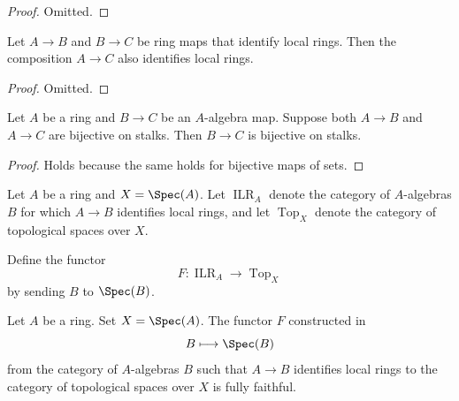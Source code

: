 \begin{proof}
  \leanok
  Omitted.
\end{proof}

\begin{lemma}
  \label{thm:identifies-local-rings-composition}
  Let \(A \to B\) and \(B \to C\) be ring maps that identify local rings. Then the composition \(A \to C\) also identifies local rings.
  \leanok
\end{lemma}

\begin{proof}
  \leanok
  Omitted.
\end{proof}

\begin{lemma}[\stacksproject{096D}]
    Let $A$ be a ring and $B \to C$ be an $A$-algebra map. Suppose both
    $A \to B$ and $A \to C$ are bijective on stalks. Then $B \to C$ is bijective on stalks.
    \label{lemma:bijective-on-stalks-of-comp}
    \leanok
\end{lemma}

\begin{proof}
    \leanok
    Holds because the same holds for bijective maps of sets.
\end{proof}

\begin{definition}
  \label{def:identifies-local-ring-to-top}
  Let $A$ be a ring and $X = \Spec(A)$. Let $\operatorname{ILR}_A$ denote the category of $A$-algebras $B$ for which $A \to B$ identifies local rings, and let $\operatorname{Top}_X$ denote the category of topological spaces over $X$.
  
  Define the functor
  \[
  F \colon \operatorname{ILR}_A \longrightarrow \operatorname{Top}_X
  \]
  by sending $B$ to $\Spec(B)$.
\end{definition}

\begin{lemma}{\cite[\href{https://stacks.math.columbia.edu/tag/096L}{Tag 096L}]{stacks-project}}
  \label{thm:identifies-local-ring-to-top-fully-faithful}
  Let $A$ be a ring. Set $X = \Spec (A)$. The functor \(F\) constructed in 
  \[
  B \longmapsto \Spec (B)
  \]
  from the category of $A$-algebras $B$ such that $A \to B$ identifies local rings to the category of topological spaces over $X$ is fully faithful.
\end{lemma}


